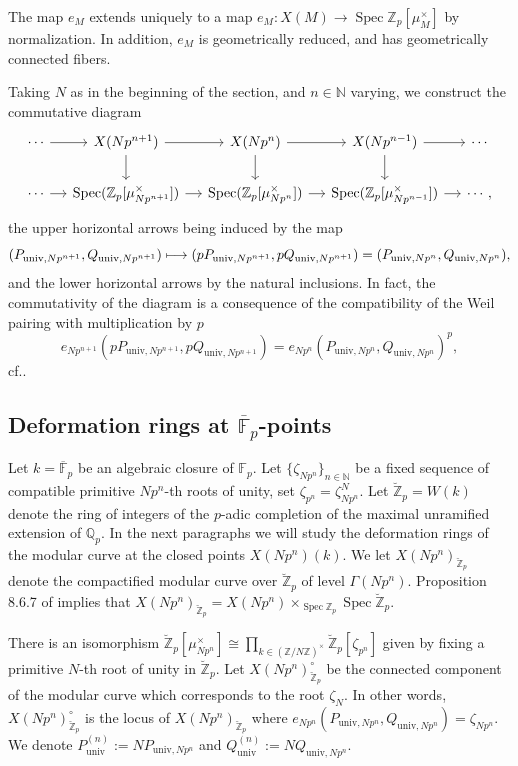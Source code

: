 \documentclass[11pt]{article}
\newcommand{\cf}{cf.\xspace}
\newcommand\mto{\mathchoice{\longmapsto}{\mapsto}{\mapsto}{\mapsto}}
\newcommand{\univ}{\mathrm{univ}}
\numberwithin{equation}{section}
\theoremstyle{definition}
\newcommand{\bb}[1]{\mathbb{#1}}
\DeclareMathOperator{\Spec}{Spec}
\newcommand{\mc}[1]{X(Np^{#1})}
\begin{document}
The map $e_M$ extends uniquely to a map $e_M: X(M)\to \Spec \bb{Z}_p[\mu_{M}^\times]$ by normalization. In addition, $e_M$ is geometrically reduced, and has geometrically connected fibers.

Taking $N$ as in the beginning of the section, and $n\in \bb{N}$ varying, we construct the commutative diagram\vspace*{-3pt}
\[
\begin{tikzcd}[column sep = small]
\cdots \ar[r] & \mc{n+1}\ar[d] \ar[r] & \mc{n} \ar[d]\ar[r] & \mc{n-1} \ar[r]\ar[d]& \cdots \\
\cdots \ar[r] & \Spec(\bb{Z}_p[\mu^\times_{Np^{n+1}}]) \ar[r]& \Spec(\bb{Z}_p[\mu^\times_{Np^{n}}]) \ar[r]& \Spec(\bb{Z}_p[\mu^\times_{Np^{n-1}}]) \ar[r] & \cdots,
\end{tikzcd}
\]
the upper horizontal arrows being induced by the map\vspace*{-3pt}
\[
(P_{\univ,Np^{n+1}}, Q_{\univ,Np^{n+1}})\mto (pP_{\univ,Np^{n+1}}, pQ_{\univ,Np^{n+1}})=(P_{\univ,Np^{n}}, Q_{\univ,Np^{n}}),
\]
and the lower horizontal arrows by the natural inclusions. In fact, the commutativity of the diagram is a consequence of the compatibility of the Weil pairing with multiplication by $p$\vspace*{-3pt}
\[
e_{Np^{n+1}}(pP_{\univ,Np^{n+1}}, pQ_{\univ,Np^{n+1}})= e_{Np^{n}}(P_{\univ,Np^{n}}, Q_{\univ,Np^{n}})^p,
\]
\cf \cite[Th.\,5.5.7 \& 5.6.3]{katz1985arithmetic}.

\subsection*{Deformation rings at $\overline{\bb{F}}_p$-points}

Let $k=\overline{\bb{F}}_p$ be an algebraic closure of $\bb{F}_p$. Let $\{\zeta_{Np^n}\}_{n\in \bb{N}}$ be a fixed sequence of compatible primitive $Np^n$-th roots of unity, set $\zeta_{p^n}=\zeta_{Np^n}^{N}$. Let $\breve{\bb{Z}}_{p}=W(k)$ denote the ring of integers of the $p$-adic completion of the maximal unramified extension of $\bb{Q}_p$. In the next paragraphs we will study the deformation rings of the modular curve at the closed points $X(Np^n)(k)$. We let $X(Np^n)_{\breve{\bb{Z}}_p}$ denote the compactified modular curve over $\breve{\bb{Z}}_p$ of level $\Gamma(Np^n)$. Proposition 8.6.7 of \cite{katz1985arithmetic} implies that $\mc{n}_{\breve{\bb{Z}}_p}= \mc{n}\times_{\Spec \bb{Z}_p} \Spec \breve{\bb{Z}}_p$.

There is an isomorphism $\breve{\bb{Z}}_p [\mu_{Np^n}^{\times}]\cong \prod_{k\in (\bb{Z}/N\bb{Z})^{\times}} \breve{\bb{Z}}_p[\zeta_{p^n}]$ given by fixing a primitive $N$-th root of unity in $\breve{\bb{Z}}_p$. Let $\mc{n}_{\breve{\bb{Z}}_p}^{\circ}$ be the connected component of the modular curve which corresponds to the root $\zeta_N$. In other words, $\mc{n}_{\breve{\bb{Z}}_p}^\circ$ is the locus of $\mc{n}_{\breve{\bb{Z}}_p}$ where $e_{Np^n}(P_{\univ,Np^n}, Q_{\univ,Np^n})= \zeta_{Np^n}$. We denote $P_{\univ}^{(n)}:=N P_{\univ,Np^{n}}$ and $Q_{\univ}^{(n)}:=NQ_{\univ,Np^n}$.
\end{document}
